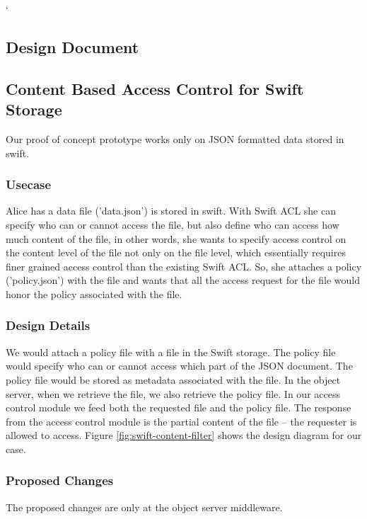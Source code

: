 \newpage
`
\newpage
\begin{appendices}
\section{Design Document} \label{App:design-document}

\subsection{  Content Based Access Control for Swift Storage }
Our proof of concept prototype works only on JSON formatted data stored in swift.

\subsubsection{ Usecase}
Alice has a  data file ('data.json') is stored in swift. With Swift ACL she can specify who can or cannot access the file, but also define who can access how much content of the file, in other words,  she wants to specify access control on the content level of the file not only on the file level,  which essentially requires  finer grained access control than the existing Swift ACL. So, she  attaches a  policy ('policy.json')  with the file and wants that all the access request for the file would honor the policy associated with the file.

\subsubsection{Design Details}
We would attach a policy file with a file in the Swift storage. The policy file would specify who can or cannot access which part of the JSON document. The policy file would be stored as metadata associated with the file. In the object server, when we retrieve the file, we also retrieve the policy file. In our access control module we feed both the requested file and the policy file. The response from the access control module is the partial content of the file – the requester is allowed to access. Figure \ref{fig:swift-content-filter} shows the design diagram for our case.

\subsubsection{Proposed Changes}
The proposed changes are only at the object server middleware.

\begin{itemize}


\end{itemize}
\end{appendices}
